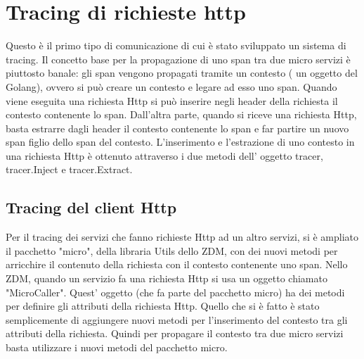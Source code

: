 \documentclass[a4paper,12pt,titlepage,italian,openany]{report}
\begin{document}
\section{Tracing di richieste http}
Questo è il primo tipo di comunicazione di cui è stato sviluppato un sistema di tracing. Il concetto base per la propagazione di uno span tra due micro servizi è piuttosto banale: gli span vengono propagati tramite un contesto ( un oggetto del Golang), ovvero si può  creare un contesto e legare ad esso uno span. Quando viene eseguita una richiesta Http si può inserire negli header della richiesta il contesto contenente lo span. 
Dall'altra parte, quando si riceve una richiesta Http, basta estrarre dagli header il contesto contenente lo span e far partire un nuovo span figlio dello span del contesto. 
L'inserimento e l'estrazione di uno contesto in una richiesta Http è ottenuto attraverso i due metodi dell' oggetto tracer, tracer.Inject e tracer.Extract.
\subsection{Tracing del client Http}
Per il tracing dei servizi che fanno richieste Http ad un altro servizi, si è ampliato il pacchetto "micro", della libraria Utils dello ZDM\cite{zdm:1}, 
con dei nuovi metodi per arricchire il contenuto della richiesta con il contesto contenente uno span.
Nello ZDM\cite{zdm:1}, quando un servizio fa una richiesta Http si usa un oggetto chiamato "MicroCaller".
 Quest' oggetto (che fa parte del pacchetto micro) ha dei metodi per definire gli attributi della richiesta Http. Quello che si è fatto è stato semplicemente di aggiungere nuovi metodi per l'inserimento 
del contesto tra gli attributi della richiesta. Quindi per propagare il contesto tra due micro servizi basta utilizzare i nuovi metodi del pacchetto micro.
\end{document}
